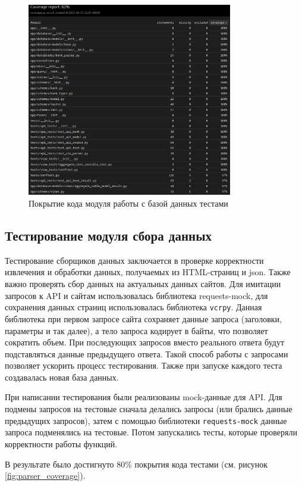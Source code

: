 \documentclass[PI, VKR]{HSEUniversity}
\begin{document}
\begin{figure}[h]
\centering
\includegraphics[width=0.8\textwidth]{img/api_coverage.png}
\caption{\label{fig:api_coverage}Покрытие кода модуля работы с базой данных тестами}
\end{figure}
\subsection{Тестирование модуля сбора данных}
\label{sec:org91b4a5d}
Тестирование сборщиков данных заключается в проверке корректности извлечения и обработки данных, получаемых из HTML-страниц и json. Также важно проверять сбор данных на актуальных данных сайтов. Для имитации запросов к API и сайтам использовалась библиотека requests-mock, для сохранения данных страниц использовалась библиотека \texttt{vcrpy}. Данная библиотека при первом запросе сайта сохраняет данные запроса (заголовки, параметры и так далее), а тело запроса кодирует в байты, что позволяет сократить объем. При последующих запросов вместо реального ответа будут подставляться данные предыдущего ответа. Такой способ работы с запросами позволяет ускорить процесс тестирования. Также при запуске каждого теста создавалась новая база данных.

При написании тестирования были реализованы mock-данные для API. Для подмены запросов на тестовые сначала делались запросы (или брались данные предыдущих запросов), затем с помощью библиотеки \texttt{requests-mock} данные запроса подменялись на тестовые. Потом запускались тесты, которые проверяли корректности работы функций.

В результате было достигнуто 80\% покрытия кода тестами (см. рисунок \ref{fig:parser_coverage}).
\end{document}

